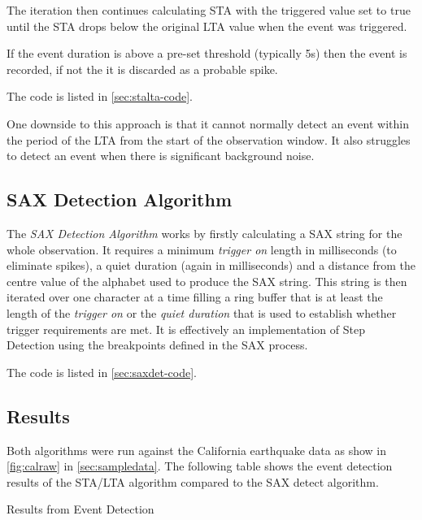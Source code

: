 \documentclass[../report.tex]{subfiles}
\begin{document}
	The iteration then continues calculating STA with the triggered value set to true until the STA drops below the original LTA value when the event was triggered.
	
	If the event duration is above a pre-set threshold (typically 5s) then the event is recorded, if not the it is discarded as a probable spike.
	
	The code is listed in \cref{sec:stalta-code}.

	One downside to this approach is that it cannot normally detect an event within the period of the LTA from the start of the observation window.  It also struggles to detect an event when there is significant background noise. 
	
\subsection{SAX Detection Algorithm} \label{sec:sax-detect}

	The \textit{SAX Detection Algorithm} works by firstly calculating a SAX string for the whole observation.  It requires a minimum \textit{trigger on} length in milliseconds (to eliminate spikes), a quiet duration (again in milliseconds) and a distance from the centre value of the alphabet used to produce the SAX string.  This string is then iterated over one character at a time filling a ring buffer that is at least the length of the \textit{trigger on} or the \textit{quiet duration} that is used to establish whether trigger requirements are met.  It is effectively an implementation of Step Detection using the breakpoints defined in the SAX process.
	
	The code is listed in \cref{sec:saxdet-code}.

\subsection{Results}
	Both algorithms were run against the California earthquake data as show in \cref{fig:calraw} in \cref{sec:sampledata}.  The following table shows the event detection results of the STA/LTA algorithm compared to the SAX detect algorithm.


\begin{table}[H]
	\centering
	\caption{Results from Event Detection}
	\\
\end{table}
\end{document}
